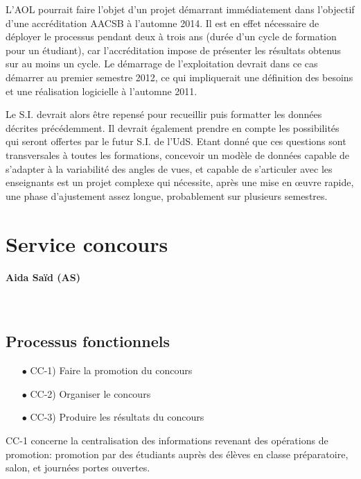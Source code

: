 \documentclass{book}
\begin{document}
L'AOL pourrait faire l'objet d'un projet démarrant immédiatement dans l'objectif
d'une  accréditation AACSB  à  l'automne 2014.  Il est  en  effet nécessaire  de
déployer le  processus pendant deux à  trois ans (durée d'un  cycle de formation
pour un étudiant), car l'accréditation impose de présenter les résultats obtenus
sur  au moins  un cycle.  Le  démarrage de  l'exploitation devrait  dans ce  cas
démarrer  au premier  semestre  2012,  ce qui  impliquerait  une définition  des
besoins et une réalisation logicielle à l'automne 2011.

Le S.I.  devrait alors être repensé  pour recueillir puis formatter  les données
décrites précédemment. Il  devrait également prendre en  compte les possibilités
qui seront offertes par le futur  S.I.  de l'UdS. Etant donné que
ces questions sont transversales à toutes les formations, concevoir un modèle de
données capable de s'adapter à la variabilité  des angles de vues, et capable de
s'articuler avec les enseignants est un projet complexe qui nécessite, après une
mise en {\oe}uvre rapide, une  phase d'ajustement assez longue, probablement sur
plusieurs semestres.





\section{Service concours }
\paragraph{Aida Saïd (AS)}
~\\

\subsection{Processus fonctionnels}
\label{sc:concours-process}

\begin{itemize}
\item[$\bullet$] CC-1) Faire la promotion du concours
\item[$\bullet$] CC-2) Organiser le concours
\item[$\bullet$] CC-3) Produire les résultats du concours
\end{itemize}
\bigskip

CC-1 concerne la centralisation des informations revenant des
opérations de promotion: promotion par des étudiants auprès  des 
élèves en classe préparatoire, salon, et journées portes 
ouvertes.\\ 
\end{document}
